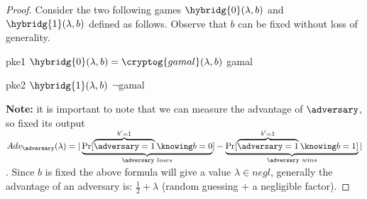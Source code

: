 \begin{proof}
    Consider the two following games $\hybridg{0}(\lambda, b)$ and $\hybridg{1}(\lambda, b)$ defined as follows. Observe that $b$ can be fixed without loss of generality.
    
    \begin{cryptogame}
        {pke1}
        {$\hybridg{0}(\lambda, b) = \cryptog{gamal}(\lambda, b)$}
        {gamal}


        \cseqdelay
        \cseqdelay
        \cseqdelay


    \end{cryptogame}

    \begin{cryptogame}
        {pke2}
        {$\hybridg{1}(\lambda, b)$}
        {$\neg$gamal}


        \cseqdelay
        \cseqdelay
        \cseqdelay


    \end{cryptogame}
    

    \textbf{Note:} it is important to note that we can measure the advantage of $\adversary$, so fixed its output $Adv_{\adversary}(\lambda) = |\underbrace{\Pr[\overbrace{\adversary = 1}^{b' = 1} \knowing b = 0}_{\adversary\ loses}] - \underbrace{\Pr[\overbrace{\adversary = 1}^{b' = 1} \knowing b = 1]}_{\adversary\ wins}|$. Since $b$ is fixed the above formula will give a value $\lambda \in negl$, generally the advantage of an adversary is: $\frac{1}{2}+\lambda$ (random guessing + a negligible factor). %


\end{proof}
